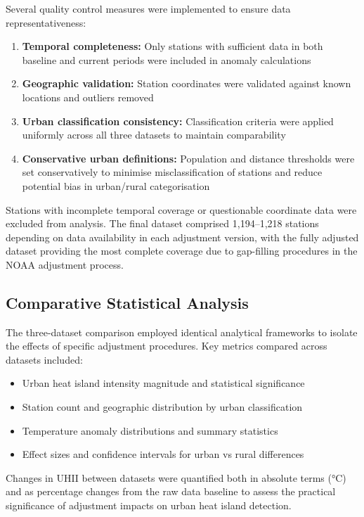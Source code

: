 \documentclass[11pt, a4paper]{article}
\begin{document}
  Several quality control measures were implemented to ensure data representativeness:

\begin{enumerate}
  \item \textbf{Temporal completeness:} Only stations with sufficient data in both baseline and current periods were included in anomaly calculations
  \item \textbf{Geographic validation:} Station coordinates were validated against known locations and outliers removed
  \item \textbf{Urban classification consistency:} Classification criteria were applied uniformly across all three datasets to maintain comparability
  \item \textbf{Conservative urban definitions:} Population and distance thresholds were set conservatively to minimise misclassification of stations and reduce potential bias in urban/rural categorisation
\end{enumerate}

Stations with incomplete temporal coverage or questionable coordinate data were excluded from analysis. The final dataset comprised 1,194--1,218 stations depending on data availability in each adjustment version, with the fully adjusted dataset providing the most complete coverage due to gap-filling procedures in the NOAA adjustment process.

  \subsection{Comparative Statistical Analysis}

  The three-dataset comparison employed identical analytical frameworks to isolate the effects of specific adjustment procedures. Key metrics compared across datasets included:

\begin{itemize}
  \item Urban heat island intensity magnitude and statistical significance
  \item Station count and geographic distribution by urban classification
  \item Temperature anomaly distributions and summary statistics
  \item Effect sizes and confidence intervals for urban vs rural differences
\end{itemize}

 Changes in UHII between datasets were quantified both in absolute terms (°C) and as percentage changes from the raw data baseline to assess the practical significance of adjustment impacts on urban heat island detection.
  
\end{document}
